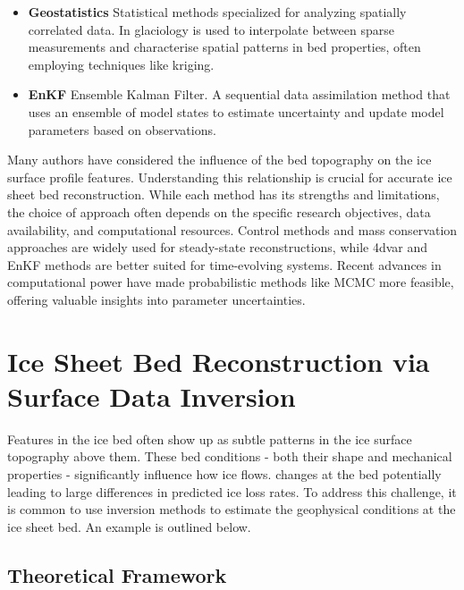 \begin{itemize}
    \item\textbf{Geostatistics} Statistical methods specialized for analyzing spatially correlated data. In glaciology is used to interpolate between sparse measurements and characterise spatial patterns in bed properties, often employing techniques like kriging\cite{Mackie_2020}.

    \item\textbf{EnKF} Ensemble Kalman Filter. A sequential data assimilation method that uses an ensemble of model states to estimate uncertainty and update model parameters based on observations\cite{Morlighem_Goldberg_2024}.
    
\end{itemize} 
Many authors have considered the influence of the bed topography on the ice surface profile features. Understanding this relationship is crucial for accurate ice sheet bed reconstruction\cite{Budd_1970}. While each method has its strengths and limitations, the choice of approach often depends on the specific research objectives, data availability, and computational resources. Control methods and mass conservation approaches are widely used for steady-state reconstructions, while 4dvar and EnKF methods are better suited for time-evolving systems. Recent advances in computational power have made probabilistic methods like MCMC more feasible, offering valuable insights into parameter uncertainties.

\newpage
\section*{Ice Sheet Bed Reconstruction via Surface Data Inversion}\label{Ockenden_2022}

Features in the ice bed often show up as subtle patterns in the ice surface topography above them\cite{Ockenden_2022}. These bed conditions - both their shape and mechanical properties - significantly influence how ice flows. changes at the bed potentially leading to large differences in predicted ice loss rates\cite{Ockenden_2022}. To address this challenge, it is common to use inversion methods to estimate the geophysical conditions at the ice sheet bed. An example is outlined below.

\subsection*{Theoretical Framework}

